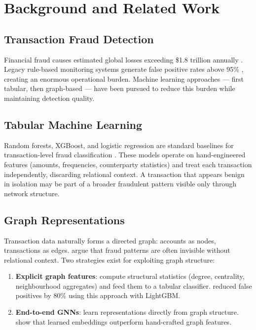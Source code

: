 \chapter{Background and Related Work}
\label{chap:background}

\section{Transaction Fraud Detection}
\label{sec:fraud-detection}

Financial fraud causes estimated global losses exceeding \$1.8 trillion annually \citep{vallarino2025fraud}. Legacy rule-based monitoring systems generate false positive rates above 95\% \citep{gerlings2023xai, cardoso2022laundrograph}, creating an enormous operational burden. Machine learning approaches --- first tabular, then graph-based --- have been pursued to reduce this burden while maintaining detection quality.

\section{Tabular Machine Learning}
\label{sec:trad-ml}

Random forests, XGBoost, and logistic regression are standard baselines for transaction-level fraud classification \citep{cheng2024survey}. These models operate on hand-engineered features (amounts, frequencies, counterparty statistics) and treat each transaction independently, discarding relational context. A transaction that appears benign in isolation may be part of a broader fraudulent pattern visible only through network structure.

\section{Graph Representations}
\label{sec:graph-representations}

Transaction data naturally forms a directed graph: accounts as nodes, transactions as edges. \citet{johannessen2023hmpnn} argue that fraud patterns are often invisible without relational context. Two strategies exist for exploiting graph structure:

\begin{enumerate}[nosep]
  \item \textbf{Explicit graph features}: compute structural statistics (degree, centrality, neighbourhood aggregates) and feed them to a tabular classifier. \citet{nasereddin2021alert} reduced false positives by 80\% using this approach with LightGBM.
  \item \textbf{End-to-end GNNs}: learn representations directly from graph structure. \citet{cardoso2022laundrograph} show that learned embeddings outperform hand-crafted graph features.
\end{enumerate}

